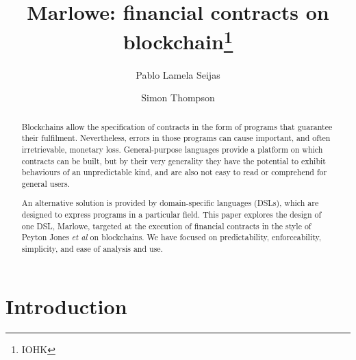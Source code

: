 \documentclass[runningheads]{llncs}
\begin{document}
%
%
\title {Marlowe: financial contracts on blockchain\thanks{IOHK}}
%
%
\author{Pablo Lamela Seijas\\
\and Simon Thompson}
%
%


\begin{abstract}

Blockchains allow the specification of contracts in the form of programs that guarantee their fulfilment. 
Nevertheless, errors in those programs can cause important, and often irretrievable, monetary loss. General-purpose 
languages provide a platform on which contracts can be built, but by their very generality they have the potential to 
exhibit behaviours of an unpredictable kind, and are also not easy to read or comprehend for general users. 

An alternative solution is provided by domain-specific languages (DSLs), which are designed to express programs in a 
particular field. This paper explores the design of one DSL, Marlowe, targeted at the execution of financial 
contracts in the style of Peyton Jones \emph{et al} on blockchains. We have focused on predictability, enforceability, 
simplicity, and ease of analysis and use.

\end{abstract}



%
%


\maketitle


\section{Introduction}
\end{document}
